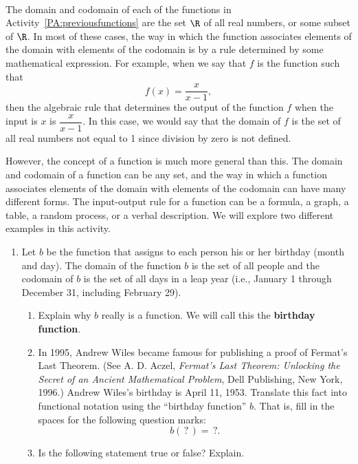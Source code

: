 \begin{previewactivity} \label{PA:otherfunctions} \hfill \\
The domain and codomain of each of the functions in \typeu Activity~\ref*{PA:previousfunctions} are the set  $\R$ of all real numbers, or some subset of   $\R$.  In most of these cases, the way in which the function associates elements of the domain with elements of the codomain is by a rule determined by some mathematical expression.  For example, when we say that $f$  is the function such that
\[
f( x ) = \dfrac{x}{{x - 1}},
\]
then the algebraic rule that determines the output of the function  $f$  when the input is  $x$  is  
$\dfrac{x}{{x - 1}}$.  In this case, we would say that the domain of  $f$  is the set of all real numbers not equal to  1 since division by zero is not defined.

However, the concept of a function is much more general than this.  The domain and codomain of a function can be any set, and the way in which a function associates elements of the domain with elements of the codomain can have many different forms. The input-output rule for a function can be a formula, a graph, a table, a random process, or a verbal description.  We will explore two different examples in this activity.

\begin{enumerate}
  \item Let  $b$  be the function that assigns to each person his or her birthday (month and day).  The domain of the function  $b$  is the set of all people and the codomain of  $b$  is the set of all days in a leap year (i.e., January 1 through December 31, including February 29).

\begin{enumerate}
\item Explain why  $b$  really is a function.  We will call this the \textbf{birthday function}.
%

\item In 1995, Andrew Wiles
%
 became famous for publishing a proof of Fermat's Last Theorem.  (See A. D. Aczel, \textit{Fermat's Last Theorem: Unlocking the Secret of an Ancient Mathematical Problem}, Dell Publishing, New York, 1996.)  Andrew Wiles's birthday is April 11, 1953.  Translate this fact into functional notation using the ``birthday function'' $b$.  That is, fill in the spaces for the following question marks:
\[
b( {\,?\,} ) = \,?.
\]
\item Is the following statement true or false?  Explain.


\end{enumerate}
\end{enumerate}
\end{previewactivity}
